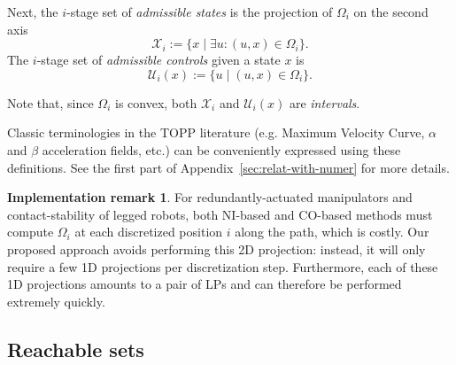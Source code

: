 \documentclass[journal]{IEEEtran}
\theoremstyle{plain}
\theoremstyle{definition}
\theoremstyle{definition}
\newtheorem{remark2}{Implementation remark}
\newenvironment{remark}
  {\renewcommand{\qedsymbol}{$\lozenge$}%
   \pushQED{\qed}\begin{remark2}}
  {\popQED\end{remark2}}
\newcommand{\calX}{\mathcal{X}}
\newcommand{\calU}{\mathcal{U}}
\newcommand{\bbI}{\mathbb{I}}
\begin{document}
Next, the $i$-stage set of \emph{admissible states} is the projection of
$\Omega_{i}$ on the second axis
\begin{equation*}
  \calX_i:= \{x \mid \exists u: (u,x) \in \Omega_i \}.
\end{equation*}
The $i$-stage set of \emph{admissible controls} given a state $x$ is
\begin{equation*}
  \calU_i(x):= \{u \mid (u, x) \in \Omega_i \}.
\end{equation*}

Note that, since $\Omega_i$ is convex, both $\calX_i$ and $\calU_i(x)$
are \emph{intervals}.

Classic terminologies in the TOPP literature (e.g. Maximum Velocity
Curve, $\alpha$ and $\beta$ acceleration fields, etc.) can be
conveniently expressed using these definitions. See the first part of
Appendix~\ref{sec:relat-with-numer} for more details.

\begin{remark}
  \label{rem:redundant}
 For redundantly-actuated manipulators and contact-stability of legged
 robots, both NI-based and CO-based methods must compute $\Omega_i$ at
 each discretized position $i$ along the path, which is costly. Our
 proposed approach avoids performing this 2D projection: instead, it
 will only require a few 1D projections per discretization
 step. Furthermore, each of these 1D projections amounts to a pair of
 LPs and can therefore be performed extremely quickly.
\end{remark}

\subsection{Reachable sets}
\label{sec:reachable-sets}

\end{document}
